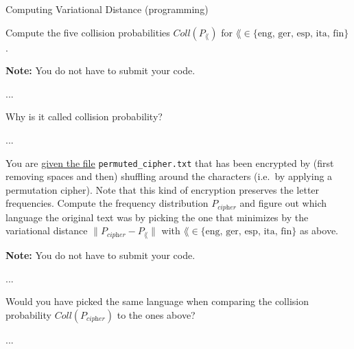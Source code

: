 \documentclass[a4paper,10pt]{article}
\begin{document}
\begin{nproblem}{8}{Computing Variational Distance (programming)}
\begin{subproblem}{2}
Compute the five collision probabilities $Coll(P_{\lang})$ for  $\lang \in \{ \textrm{eng, ger, esp, ita, fin} \}$. 

\textbf{Note:} You do not have to submit your code.
\end{subproblem}
\begin{solution}
...
\end{solution}

\begin{subproblem}{1}
 Why is it called collision probability?
\end{subproblem}
\begin{solution}
...
\end{solution}

\begin{subproblem}{2}
  You are \href{https://github.com/cschaffner/InformationTheory/blob/master/Problems/HW1/permuted_cipher.txt}{given the file} {\texttt{permuted\_cipher.txt}} that has been encrypted by (first removing spaces and then) shuffling around the
characters (i.e.\ by applying a permutation cipher). Note that this kind of 
encryption preserves the letter frequencies. Compute the frequency distribution
$P_{\textit{cipher}}$ and figure out which language the original text was by
picking the one that minimizes by the variational distance
$\| P_{\textit{cipher}} - P_{\lang}\|$ with $\lang \in \{
\textrm{eng, ger, esp, ita, fin} \}$ as above.

\textbf{Note:} You do not have to submit your code.
\end{subproblem}
\begin{solution}
...
\end{solution}

\begin{subproblem}{1}
Would you have picked the same language when comparing the collision probability $Coll(P_{\textit{cipher}})$ to the ones above?
\end{subproblem}
\begin{solution}
...
\end{solution}

\end{nproblem}




\end{document}
